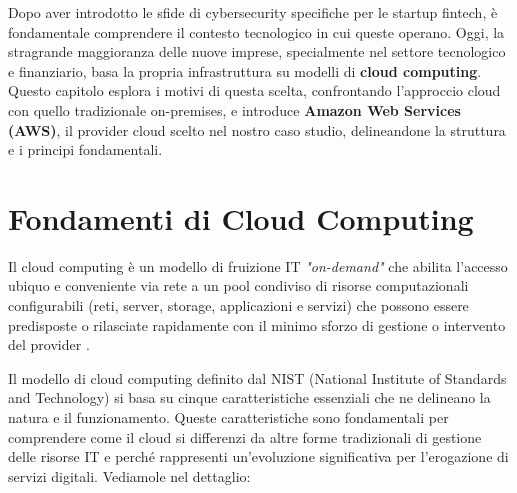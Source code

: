 Dopo aver introdotto le sfide di cybersecurity specifiche per le startup fintech, è fondamentale comprendere il contesto tecnologico in cui queste operano. Oggi, la stragrande maggioranza delle nuove imprese, specialmente nel settore tecnologico e finanziario, basa la propria infrastruttura su modelli di \textbf{cloud computing}. Questo capitolo esplora i motivi di questa scelta, confrontando l'approccio cloud con quello tradizionale on-premises, e introduce \textbf{Amazon Web Services (AWS)}, il provider cloud scelto nel nostro caso studio, delineandone la struttura e i principi fondamentali.

\section{Fondamenti di Cloud Computing}
Il cloud computing è un modello di fruizione IT \textit{"on-demand"} che abilita l'accesso ubiquo e conveniente via rete a un pool condiviso di risorse computazionali configurabili (reti, server, storage, applicazioni e servizi) che possono essere predisposte o rilasciate rapidamente con il minimo sforzo di gestione o intervento del provider \cite{nist800-145}.

Il modello di cloud computing definito dal NIST (National Institute of Standards and Technology) si basa su cinque caratteristiche essenziali che ne delineano la natura e il funzionamento. Queste caratteristiche sono fondamentali per comprendere come il cloud si differenzi da altre forme tradizionali di gestione delle risorse IT e perché rappresenti un'evoluzione significativa per l'erogazione di servizi digitali. Vediamole nel dettaglio:



